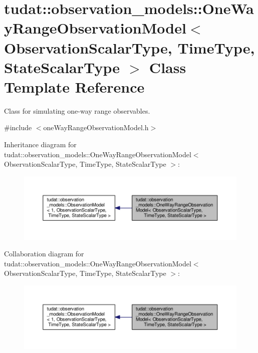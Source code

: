 \hypertarget{classtudat_1_1observation__models_1_1OneWayRangeObservationModel}{}\section{tudat\+:\+:observation\+\_\+models\+:\+:One\+Way\+Range\+Observation\+Model$<$ Observation\+Scalar\+Type, Time\+Type, State\+Scalar\+Type $>$ Class Template Reference}
\label{classtudat_1_1observation__models_1_1OneWayRangeObservationModel}


Class for simulating one-\/way range observables.  




{\ttfamily \#include $<$one\+Way\+Range\+Observation\+Model.\+h$>$}



Inheritance diagram for tudat\+:\+:observation\+\_\+models\+:\+:One\+Way\+Range\+Observation\+Model$<$ Observation\+Scalar\+Type, Time\+Type, State\+Scalar\+Type $>$\+:
\nopagebreak
\begin{figure}[H]
\begin{center}
\leavevmode
\includegraphics[width=350pt]{classtudat_1_1observation__models_1_1OneWayRangeObservationModel__inherit__graph}
\end{center}
\end{figure}


Collaboration diagram for tudat\+:\+:observation\+\_\+models\+:\+:One\+Way\+Range\+Observation\+Model$<$ Observation\+Scalar\+Type, Time\+Type, State\+Scalar\+Type $>$\+:
\nopagebreak
\begin{figure}[H]
\begin{center}
\leavevmode
\includegraphics[width=350pt]{classtudat_1_1observation__models_1_1OneWayRangeObservationModel__coll__graph}
\end{center}
\end{figure}
